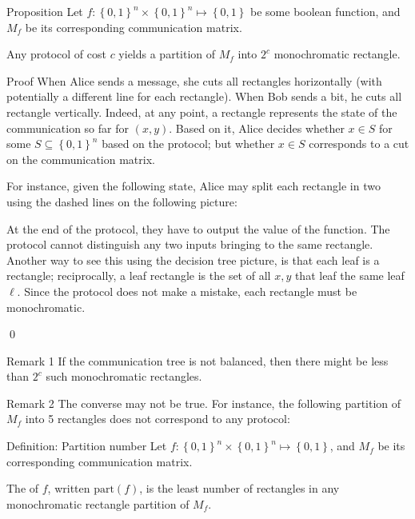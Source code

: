 \documentclass[a4paper]{article}
\begin{document}
\begin{parag}{Proposition}
    Let $f: \left\{0, 1\right\}^n \times \left\{0, 1\right\}^n \mapsto \left\{0,1\right\}$ be some boolean function, and $M_f$ be its corresponding communication matrix.

    Any protocol of cost $c$ yields a partition of $M_f$ into $2^c$ monochromatic rectangle.

    \begin{subparag}{Proof}
        When Alice sends a message, she cuts all rectangles horizontally (with potentially a different line for each rectangle). When Bob sends a bit, he cuts all rectangle vertically. Indeed, at any point, a rectangle represents the state of the communication so far for $\left(x, y\right)$. Based on it, Alice decides whether $x \in S$ for some $S \subseteq \left\{0, 1\right\}^n$ based on the protocol; but whether $x \in S$ corresponds to a cut on the communication matrix.

        For instance, given the following state, Alice may split each rectangle in two using the dashed lines on the following picture:

        At the end of the protocol, they have to output the value of the function. The protocol cannot distinguish any two inputs bringing to the same rectangle. Another way to see this using the decision tree picture, is that each leaf is a rectangle; reciprocally, a leaf rectangle is the set of all $x, y$ that leaf the same leaf $\ell$. Since the protocol does not make a mistake, each rectangle must be monochromatic. 
        
        \qed
    \end{subparag}

    \begin{subparag}{Remark 1}
        If the communication tree is not balanced, then there might be less than $2^c$ such monochromatic rectangles.
    \end{subparag}

    \begin{subparag}{Remark 2}
        The converse may not be true. For instance, the following partition of $M_f$ into 5 rectangles does not correspond to any protocol:
    \end{subparag}
\end{parag}

\begin{parag}{Definition: Partition number}
    Let $f: \left\{0, 1\right\}^n \times \left\{0, 1\right\}^n \mapsto \left\{0, 1\right\}$, and $M_f$ be its corresponding communication matrix.

    The  of $f$, written $\text{part}\left(f\right)$, is the least number of rectangles in any monochromatic rectangle partition of $M_f$.
\end{parag}
\end{document}
